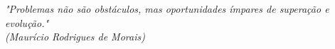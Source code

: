 \begin{epigrafe}
    \vspace*{\fill}
	\begin{flushright}
		\textit{"Problemas não são obstáculos, mas oportunidades ímpares de superação e evolução."\\
		(Maurício Rodrigues de Morais)}
	\end{flushright}
\end{epigrafe}
